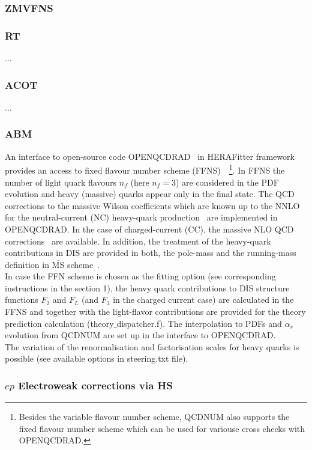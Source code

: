 \documentclass[11pt,a4paper]{article}
\begin{document}
\subsubsection{ZMVFNS}
\subsubsection{RT}
... 
\subsubsection{ACOT}
...
\subsubsection{ABM}
An interface to open-source code OPENQCDRAD~\cite{openqcdrad_page} in HERAFitter framework 
provides an access to 
fixed flavour number scheme (FFNS)~\cite{ffns:pub}~\footnote{Besides the variable flavour number 
scheme, QCDNUM also supports the fixed flavour number scheme which can be used for variouse 
cross checks with OPENQCDRAD.}. In FFNS the number of light quark 
flavours $n_{f}$ (here $n_{f}=3$) are considered in the PDF evolution and heavy (massive) 
quarks appear only in the final state. 
The QCD corrections to the massive Wilson coefficients which are known up to the NNLO
for the neutral-current (NC) heavy-quark production~\cite{} are implemented in OPENQCDRAD.
In the case of charged-current (CC), the massive NLO QCD corrections~\cite{} are available.
In addition, the treatment of the heavy-quark contributions in DIS are provided 
in both, the pole-mass and the running-mass definition in $\overline{\text{MS}}$ 
scheme~\cite{run_mass:pub}. \\
In case the FFN scheme is chosen as the fitting option (see corresponding instructions in the section 1),
the heavy quark contributions to DIS structure functions $F_2$ and $F_L$ (and $F_3$ in the charged 
current case) are calculated in the FFNS and together with the light-flavor contributions are 
provided for the theory prediction calculation (theory$\_$dispatcher.f).
The interpolation to PDFs and $\alpha_s$ evolution from QCDNUM are set up in the interface to OPENQCDRAD. \\
The variation of the renormalisation and factorisation scales for heavy quarks is 
possible (see available options in steering.txt file).
%
%       
\subsubsection{$ep$ Electroweak corrections via HS}
\end{document}
